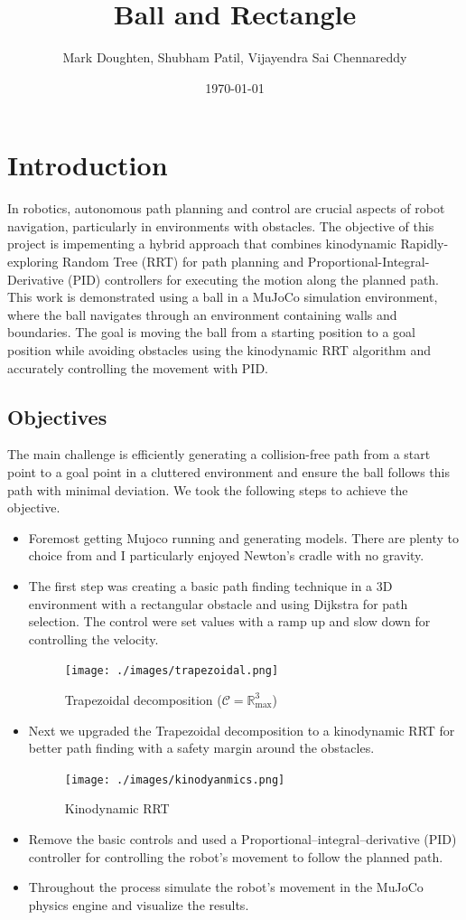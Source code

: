 \documentclass[12pt]{article}
\title{Ball and Rectangle}
\author{Mark Doughten, Shubham Patil, Vijayendra Sai Chennareddy}
\date{\today}
\begin{document}
\maketitle

\section{Introduction}
In robotics, autonomous path planning and control are crucial aspects of robot navigation, particularly in environments with obstacles. The objective of this project is impementing a hybrid approach that combines kinodynamic Rapidly-exploring Random Tree (RRT) for path planning and Proportional-Integral-Derivative (PID) controllers for executing the motion along the planned path. This work is demonstrated using a ball in a MuJoCo simulation environment, where the ball navigates through an environment containing walls and boundaries. The goal is moving the ball from a starting position to a goal position while avoiding obstacles using the kinodynamic RRT algorithm and accurately controlling the movement with PID.

\subsection{Objectives}
The main challenge is efficiently generating a collision-free path from a start point to a goal point in a cluttered environment and ensure the ball follows this path with minimal deviation. We took the following steps to achieve the objective.
\begin{itemize}
    \item Foremost getting Mujoco running and generating models. There are plenty to choice from and I particularly enjoyed Newton's cradle with no gravity. 
    \item The first step was creating a basic path finding technique in a 3D environment with a rectangular obstacle and using Dijkstra for path selection. The control were set values with a ramp up and slow down for controlling the velocity. 
    \begin{figure}[h!]
      \centering
      \texttt{[image: ./images/trapezoidal.png]}
      \caption{Trapezoidal decomposition (\(\mathcal{C} = \mathbb{R}^3_{\text{max}}\))}
      \label{fig:sample_image}
    \end{figure}
    \item Next we upgraded the Trapezoidal decomposition to a kinodynamic RRT for better path finding with a safety margin around the obstacles. 
    \begin{figure}[h!]
    \centering
      \texttt{[image: ./images/kinodyanmics.png]}
      \caption{Kinodynamic RRT}
      \label{fig:sample_image}
    \end{figure}
    \item Remove the basic controls and used a Proportional–integral–derivative (PID) controller for controlling the robot's movement to follow the planned path.
    \item Throughout the process simulate the robot's movement in the MuJoCo physics engine and visualize the results.
\end{itemize}
\end{document}
